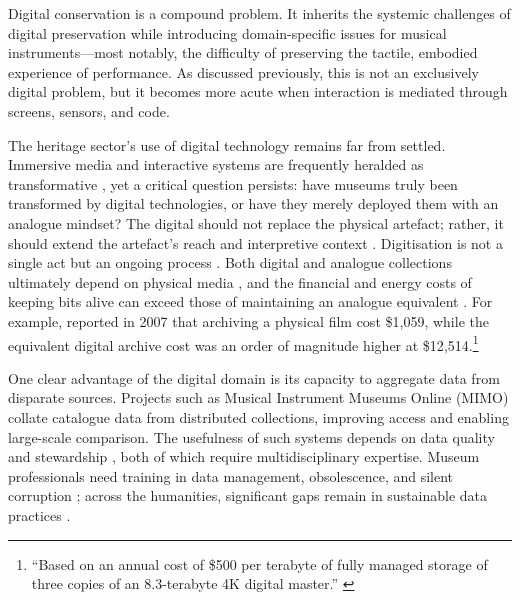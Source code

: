 Digital conservation is a compound problem. It inherits the systemic challenges
of digital preservation while introducing domain-specific issues for musical
instruments---most notably, the difficulty of preserving the tactile, embodied
experience of performance. As discussed previously, this is not an exclusively
digital problem, but it becomes more acute when interaction is mediated through
screens, sensors, and code.


The heritage sector’s use of digital technology remains far from settled.
Immersive media and interactive systems are frequently heralded as
transformative \cite{gedert_technology_2017, li_systematic_2024,
dutot_changing_2021}, yet a critical question persists: have museums truly been
transformed by digital technologies, or have they merely deployed them with an
analogue mindset? The digital should not replace the physical artefact; rather,
it should extend the artefact’s reach and interpretive context
\cite{foster_defining_1998, parry_museums_2010}. Digitisation is not a single
act but an ongoing process \cite{rubio_work_2020, kelley_digital_2018}. Both
digital and analogue collections ultimately depend on physical media
\cite{rubio_work_2020}, and the financial and energy costs of keeping bits alive
can exceed those of maintaining an analogue equivalent
\cite{cieply_afterlife_2007}. For example, 
\cite{science_digital_2007} reported in 2007 that archiving a physical film cost
\$1{,}059, while the equivalent digital archive cost was an order of magnitude
higher at \$12{,}514.\footnote{``Based on an annual cost of \$500 per terabyte
of fully managed storage of three copies of an 8.3-terabyte 4K digital master.''
\cite{science_digital_2007}}


One clear advantage of the digital domain is its capacity to aggregate data from
disparate sources. Projects such as Musical Instrument Museums Online (MIMO)
collate catalogue data from distributed collections, improving access and
enabling large-scale comparison. The usefulness of such systems depends on data
quality and stewardship \cite{dolan_mimo_2017}, both of which require
multidisciplinary expertise. Museum professionals need training in data
management, obsolescence, and silent corruption \cite{rubio_work_2020,
schwarz_disk_2006, parry_museums_2010}; across the humanities, significant gaps
remain in sustainable data practices \cite{taylor_shaping_2022}.

